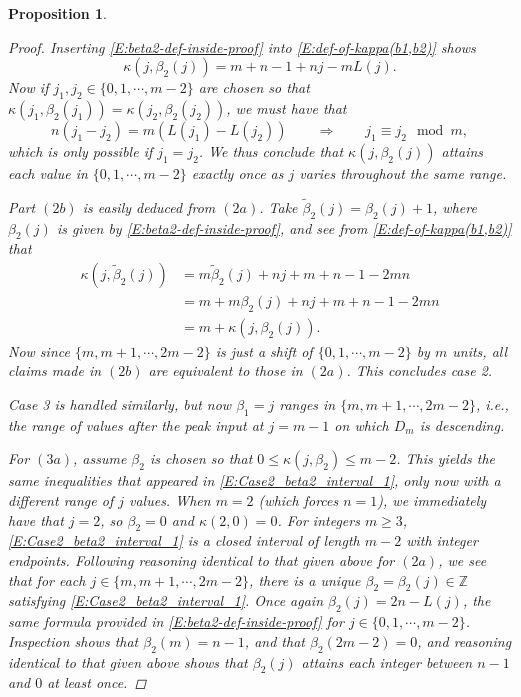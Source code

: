 \documentclass[letterpaper,11pt,reqno]{amsart}
\theoremstyle{plain}
\newtheorem{proposition}[equation]{Proposition}
\theoremstyle{definition}
\theoremstyle{remark}
\theoremstyle{remark}
\numberwithin{equation}{section}
\newcommand{\Z}{{\mathbb Z}}
\begin{document}
\begin{proposition}
\begin{proof}
Inserting \eqref{E:beta2-def-inside-proof} into \eqref{E:def-of-kappa(b1,b2)} shows 
\begin{equation*}
\kappa(j,\beta_2(j)) = m+n-1+nj-mL(j).
\end{equation*}
Now if $j_1,j_2 \in \{0,1,\cdots,m-2\}$ are chosen so that $\kappa(j_1,\beta_2(j_1)) = \kappa(j_2,\beta_2(j_2))$, we must have that
\begin{equation*}
n(j_1-j_2) = m(L(j_1)-L(j_2)) \qquad \Longrightarrow \qquad j_1 \equiv j_2 \mod m,
\end{equation*}
which is only possible if $j_1=j_2$.
We thus conclude that $\kappa(j,\beta_2(j))$ attains each value in $\{0,1,\cdots,m-2 \}$ exactly once as $j$ varies throughout the same range.

Part $(2b)$ is easily deduced from $(2a)$. 
Take $\tilde\beta_2(j) = \beta_2(j)+1$, where $\beta_2(j)$ is given by \eqref{E:beta2-def-inside-proof}, and see from \eqref{E:def-of-kappa(b1,b2)} that
\begin{align*}
\kappa(j,\tilde\beta_2(j)) &= m \tilde\beta_2(j) + nj + m + n - 1 - 2mn \\
&= m + m\beta_2(j) + nj + m + n - 1 - 2mn \\
&= m + \kappa(j,\beta_2(j)).
\end{align*}
Now since $\{m,m+1,\cdots,2m-2 \}$ is just a shift of $\{0,1,\cdots,m-2 \}$ by $m$ units, all claims made in $(2b)$ are equivalent to those in $(2a)$.
This concludes case 2.

Case 3 is handled similarly, but now $\beta_1 = j$ ranges in $\{m,m+1,\cdots,2m-2\}$, i.e., the range of values after the peak input at $j=m-1$ on which $D_m$ is descending.

For $(3a)$, assume $\beta_2$ is chosen so that $0 \le \kappa(j,\beta_2) \le m-2$.
This yields the same inequalities that appeared in \eqref{E:Case2_beta2_interval_1}, only now with a different range of $j$ values.
When $m=2$ (which forces $n=1$), we immediately have that $j=2$, so $\beta_2 = 0$ and $\kappa(2,0) = 0$.
For integers $m \ge 3$, \eqref{E:Case2_beta2_interval_1} is a closed interval of length $m-2$ with integer endpoints.
Following reasoning identical to that given above for $(2a)$, we see that for each $j \in \{m,m+1,\cdots,2m-2\}$, there is a unique $\beta_2 = \beta_2(j) \in \Z$ satisfying \eqref{E:Case2_beta2_interval_1}.
Once again $\beta_2(j) = 2n - L(j)$, the same formula provided in \eqref{E:beta2-def-inside-proof} for $j \in  \{0,1,\cdots,m-2 \}$.
Inspection shows that $\beta_2(m) = n-1$, and that $\beta_2(2m-2) = 0$, and reasoning identical to that given above shows that $\beta_2(j)$ attains each integer between $n-1$ and $0$ at least once.


\end{proof}
\end{proposition}
\end{document}
